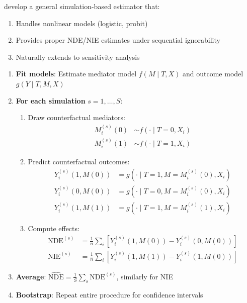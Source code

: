 \textcite{imai2010general} develop a general simulation-based estimator that:
\begin{enumerate}
\item Handles nonlinear models (logistic, probit)
\item Provides proper NDE/NIE estimates under sequential ignorability
\item Naturally extends to sensitivity analysis
\end{enumerate}

\begin{algorithm}
\label{alg:sim-mediation}
\begin{enumerate}
\item \textbf{Fit models}: Estimate mediator model $f(M \mid T, X)$ and outcome model $g(Y \mid T, M, X)$
\item \textbf{For each simulation} $s = 1, \ldots, S$:
\begin{enumerate}
\item Draw counterfactual mediators:
\begin{align}
M_i^{(s)}(0) &\sim f(\cdot \mid T=0, X_i) \\
M_i^{(s)}(1) &\sim f(\cdot \mid T=1, X_i)
\end{align}
\item Predict counterfactual outcomes:
\begin{align}
Y_i^{(s)}(1, M(0)) &= g(\cdot \mid T=1, M=M_i^{(s)}(0), X_i) \\
Y_i^{(s)}(0, M(0)) &= g(\cdot \mid T=0, M=M_i^{(s)}(0), X_i) \\
Y_i^{(s)}(1, M(1)) &= g(\cdot \mid T=1, M=M_i^{(s)}(1), X_i)
\end{align}
\item Compute effects:
\begin{align}
\text{NDE}^{(s)} &= \frac{1}{n}\sum_i \left[Y_i^{(s)}(1, M(0)) - Y_i^{(s)}(0, M(0))\right] \\
\text{NIE}^{(s)} &= \frac{1}{n}\sum_i \left[Y_i^{(s)}(1, M(1)) - Y_i^{(s)}(1, M(0))\right]
\end{align}
\end{enumerate}
\item \textbf{Average}: $\widehat{\text{NDE}} = \frac{1}{S}\sum_s \text{NDE}^{(s)}$, similarly for NIE
\item \textbf{Bootstrap}: Repeat entire procedure for confidence intervals
\end{enumerate}
\end{algorithm}

